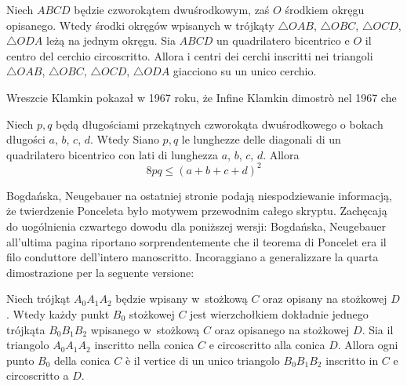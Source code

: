 \begin{proposition}
Niech $ABCD$ będzie czworokątem dwuśrodkowym, zaś $O$ środkiem okręgu opisanego. %
Wtedy środki okręgów wpisanych w trójkąty $\triangle OAB$, $\triangle OBC$, $\triangle OCD$, $\triangle ODA$ leżą na jednym okręgu. %
Sia $ABCD$ un quadrilatero bicentrico e $O$ il centro del cerchio circoscritto. %
Allora i centri dei cerchi inscritti nei triangoli $\triangle OAB$, $\triangle OBC$, $\triangle OCD$, $\triangle ODA$ giacciono su un unico cerchio. %
\end{proposition}

Wreszcie Klamkin pokazał w 1967 roku, że %
Infine Klamkin dimostrò nel 1967 che %
\begin{proposition}
Niech $p, q$ będą długościami przekątnych czworokąta dwuśrodkowego o bokach długości $a$, $b$, $c$, $d$. %
Wtedy %
Siano $p, q$ le lunghezze delle diagonali di un quadrilatero bicentrico con lati di lunghezza $a$, $b$, $c$, $d$. %
Allora %
\begin{equation}
    8 pq \le (a + b + c + d)^2
\end{equation}
\end{proposition}

Bogdańska, Neugebauer \cite[s. 267]{neugebauer_2018} na ostatniej stronie podają niespodziewanie informacją, że twierdzenie Ponceleta było motywem przewodnim całego skryptu. %
Zachęcają do uogólnienia czwartego dowodu dla poniższej wersji: %
Bogdańska, Neugebauer \cite[p. 267]{neugebauer_2018} all'ultima pagina riportano sorprendentemente che il teorema di Poncelet era il filo conduttore dell'intero manoscritto. %
Incoraggiano a generalizzare la quarta dimostrazione per la seguente versione: %

\begin{theorem}
[Ponceleta, małe] %
[di Poncelet, piccolo] %
Niech trójkąt $A_0 A_1 A_2$ będzie wpisany w~stożkową $C$ oraz opisany na stożkowej $D$. %
Wtedy każdy punkt $B_0$ stożkowej $C$ jest wierzchołkiem dokładnie jednego trójkąta $B_0 B_1 B_2$ wpisanego w~stożkową $C$ oraz opisanego na stożkowej $D$. %
Sia il triangolo $A_0 A_1 A_2$ inscritto nella conica $C$ e circoscritto alla conica $D$. %
Allora ogni punto $B_0$ della conica $C$ è il vertice di un unico triangolo $B_0 B_1 B_2$ inscritto in $C$ e circoscritto a $D$. %
\end{theorem}

